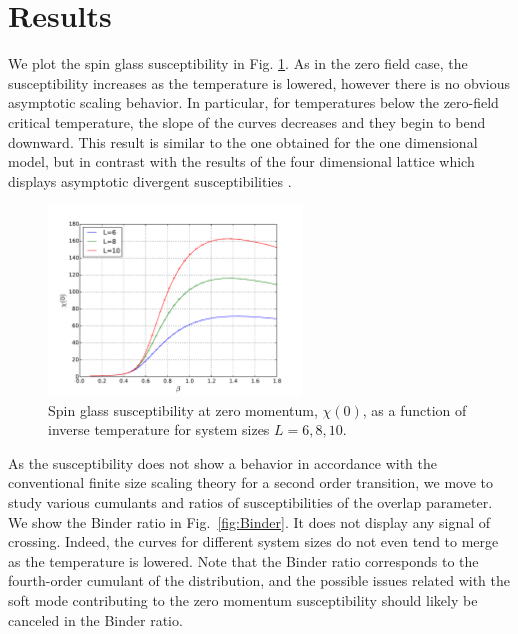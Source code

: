 \section{Results} 
We plot the spin glass susceptibility in Fig. \ref{fig:Chi}. As in the 
zero field case, the susceptibility increases as the temperature is lowered, however there is
no obvious asymptotic scaling behavior. In particular, for temperatures below  
the zero-field critical temperature, the
slope of the curves decreases and they begin to bend downward. This result is similar to the one obtained for
the one dimensional model\cite{Larson-etal-2013}, but in contrast with the results of the four dimensional lattice 
which displays asymptotic divergent susceptibilities \cite{Marinari-etal-1998}.

\begin{figure}[ht]
\centering
  \includegraphics[width=0.6\textwidth]{img/chi.pdf}%
  \caption{\label{fig:Chi} Spin glass susceptibility at zero momentum, $\chi(0)$, as a function of inverse temperature 
for system sizes $L=6,8,10$.}
\end{figure}


As the susceptibility does not show a behavior in accordance with the conventional 
finite size scaling theory for a second order transition, we move to study various 
cumulants and ratios of susceptibilities of the overlap parameter. We show the Binder ratio in Fig.~\ref{fig:Binder}. It does not display any signal of crossing. 
Indeed, the curves for different system sizes do not even tend to merge as the temperature 
is lowered.  Note that the Binder ratio corresponds to the fourth-order cumulant of the 
distribution, and 
the possible issues related with the soft mode  
contributing to the zero momentum susceptibility should likely be canceled in the Binder ratio.

